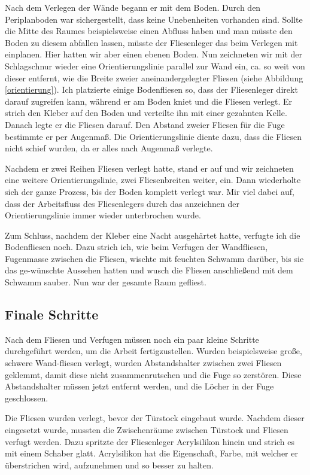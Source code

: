 Nach dem Verlegen der Wände begann er mit dem Boden. Durch den Periplanboden war sichergestellt, dass keine Unebenheiten vorhanden sind. Sollte die Mitte des Raumes beispielsweise einen Abfluss haben und man müsste den Boden zu diesem abfallen lassen, müsste der Fliesenleger das beim Verlegen mit einplanen. Hier hatten wir aber einen ebenen Boden. Nun zeichneten wir mit der Schlagschnur wieder eine Orientierungslinie parallel zur Wand ein, ca. so weit von dieser entfernt, wie die Breite zweier aneinandergelegter Fliesen (siehe Abbildung \ref{orientierung}). Ich platzierte einige Bodenfliesen so, dass der Fliesenleger direkt darauf zugreifen kann, während er am Boden kniet und die Fliesen verlegt. Er strich den Kleber auf den Boden und verteilte ihn mit einer gezahnten Kelle. Danach legte er die Fliesen darauf. Den Abstand zweier Fliesen für die Fuge bestimmte er per Augenmaß. Die Orientierungslinie diente dazu, dass die Fliesen nicht schief wurden, da er alles nach Augenmaß verlegte. 

Nachdem er zwei Reihen Fliesen verlegt hatte, stand er auf und wir zeichneten eine weitere Orientierungslinie, zwei Fliesenbreiten weiter, ein. Dann wiederholte sich der ganze Prozess, bis der Boden komplett verlegt war. Mir viel dabei auf, dass der Arbeitsfluss des Fliesenlegers durch das anzeichnen der Orientierungslinie immer wieder unterbrochen wurde. 

Zum Schluss, nachdem der Kleber eine Nacht ausgehärtet hatte, verfugte ich die Bodenfliesen noch. Dazu strich ich, wie beim Verfugen der Wandfliesen, Fugenmasse zwischen die Fliesen, wischte mit feuchten Schwamm darüber, bis sie das ge-wünschte Aussehen hatten und wusch die Fliesen anschließend mit dem Schwamm sauber. Nun war der gesamte Raum gefliest.

\subsection{Finale Schritte}

Nach dem Fliesen und Verfugen müssen noch ein paar kleine Schritte durchgeführt werden, um die Arbeit fertigzustellen. Wurden beispielsweise große, schwere Wand-fliesen verlegt, wurden Abstandshalter zwischen zwei Fliesen geklemmt, damit diese nicht zusammenrutschen und die Fuge so zerstören. Diese Abstandshalter müssen jetzt entfernt werden, und die Löcher in der Fuge geschlossen.

Die Fliesen wurden verlegt, bevor der Türstock eingebaut wurde. Nachdem dieser eingesetzt wurde, mussten die Zwischenräume zwischen Türstock und Fliesen verfugt werden. Dazu spritzte der Fliesenleger Acrylsilikon hinein und strich es mit einem Schaber glatt. Acrylsilikon hat die Eigenschaft, Farbe, mit welcher er überstrichen wird, aufzunehmen und so besser zu halten.

